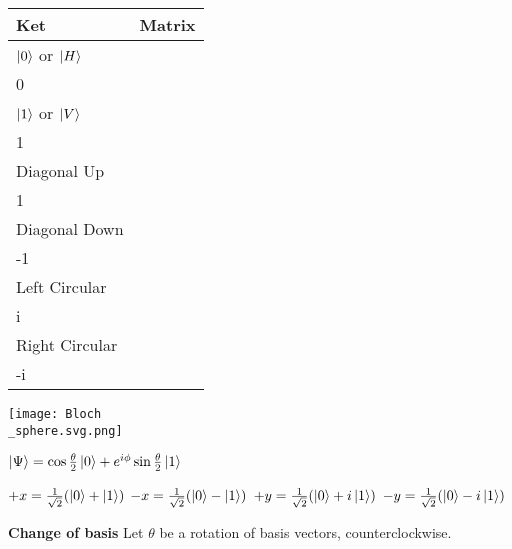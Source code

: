 \documentclass[letterpaper, 8pt]{extarticle}
\begin{document}
\begin{multicols*}{5}
    \begin{tabular}{@{}lc@{}}\toprule
        Ket                        & Matrix                                                      \\ \midrule
        \(\ket{0}\) or \(\ket{H}\) & \(\begin{bmatrix} 1 \\ 0 \end{bmatrix}\)                    \\
        \(\ket{1}\) or \(\ket{V}\) & \(\begin{bmatrix} 0 \\ 1 \end{bmatrix}\)                    \\
        Diagonal Up                & \(\frac{1}{\sqrt{2}}\begin{bmatrix} 1 \\ 1 \end{bmatrix}\)  \\
        Diagonal Down              & \(\frac{1}{\sqrt{2}}\begin{bmatrix} 1 \\ -1 \end{bmatrix}\) \\
        Left Circular              & \(\frac{1}{\sqrt{2}}\begin{bmatrix} 1 \\ i \end{bmatrix}\)  \\
        Right Circular             & \(\frac{1}{\sqrt{2}}\begin{bmatrix} 1 \\ -i \end{bmatrix}\) \\
        \bottomrule
    \end{tabular}

    \texttt{[image: Bloch\\\_sphere.svg.png]}

    \(\ket{\Psi} = \cos\frac{\theta}{2}\ket{0}+e^{i \phi}\sin\frac{\theta}{2}\ket{1}\)

    \begin{multicols*}{2}
        \(+x = \frac{1}{\sqrt{2}}(\ket{0}+\ket{1})\)
        \(-x = \frac{1}{\sqrt{2}}(\ket{0}-\ket{1})\)
        \(+y = \frac{1}{\sqrt{2}}(\ket{0}+i\ket{1})\)
        \(-y = \frac{1}{\sqrt{2}}(\ket{0}-i\ket{1})\)
    \end{multicols*}

    \textbf{Change of basis}
    Let \(\theta\) be a rotation of basis vectors,
    counterclockwise.


\end{multicols*}
\end{document}
